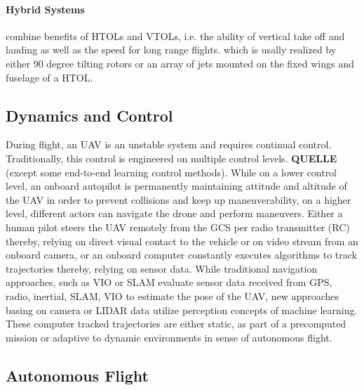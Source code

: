 \paragraph{Hybrid Systems}
combine benefits of HTOLs and VTOLs,
i.e. the ability of vertical take off and landing
as well as the speed for 
long range flights.
which is usally realized by
either 90 degree tilting rotors or
an array of jets mounted on 
the fixed wings and fuselage of a HTOL.



\subsection{Dynamics and Control}

During flight, an UAV is an unstable system
and requires continual control.
Traditionally, this control is
engineered on multiple control levels.
\textbf{QUELLE}
(except some end-to-end learning control methods).
While on a lower control level,
an onboard autopilot is 
permanently maintaining attitude and altitude of the UAV
in order to prevent 
collisions and keep up maneuverability,
on a higher level, different actors 
can navigate the drone and perform maneuvers.
Either a human pilot steers the UAV remotely from
the GCS per radio transmitter (RC)
thereby, relying on direct visual contact to the vehicle 
or on video stream from an onboard camera,
or an onboard computer constantly executes 
algorithms to track trajectories
thereby, relying on sensor data.
While traditional navigation approaches,
such as VIO or SLAM
evaluate sensor data received from
GPS, radio, inertial, SLAM, VIO
to estimate the pose of the UAV,
new approaches basing
on camera or LIDAR data utilize perception concepts
of machine learning.
These computer tracked trajectories 
are either static,
as part of a
precomputed mission or 
adaptive to dynamic environments
in sense of autonomous flight.


\subsection{Autonomous Flight}

